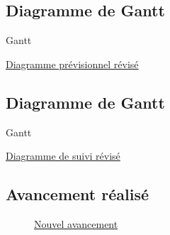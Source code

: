 \documentclass{beamer}
\begin{document}
	\subsection{Diagramme de Gantt}
	\begin{frame}{Gantt}
		\begin{center}
			\href{run:Images/Gantt_ProjetDiscretRéférence.gif}{Diagramme prévisionnel révisé}
		\end{center}
	\end{frame}

	\subsection{Diagramme de Gantt}
	\begin{frame}{Gantt}
		\begin{center}
			\href{run:Images/Gantt_ProjetDiscretSuivi.gif}{Diagramme de suivi révisé}
		\end{center}
	\end{frame}

	\subsection{Avancement réalisé}
	\begin{frame}{\subsecname}
		\begin{figure}
			\href{run:Images/CourbeAvancement.png}{Nouvel avancement}
		\end{figure}
	\end{frame}


\end{document}
